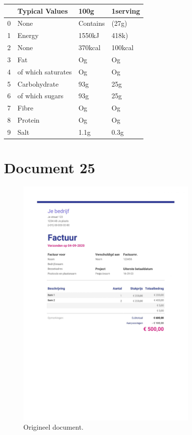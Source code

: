 \begin{tabular}{llll}
\toprule
{} &      Typical Values &      100g & 1serving \\
\midrule
0 &                None &  Contains &    (27g) \\
1 &              Energy &    1550kJ &    418k) \\
2 &                None &   370kcal &  100kcal \\
3 &                 Fat &        Og &       Og \\
4 &  of which saturates &        Og &       Og \\
5 &        Carbohydrate &       93g &      25g \\
6 &     of which sugars &       93g &      25g \\
7 &               Fibre &        Og &       Og \\
8 &             Protein &        Og &       Og \\
9 &                Salt &      1.1g &     0.3g \\
\bottomrule
\end{tabular}

\section{Document 25}

\begin{figure}[H]
    \centering
    \includegraphics[width=0.8\textwidth]{test-resultaten/25/original.jpg}
    \caption{Origineel document.}
\end{figure}

